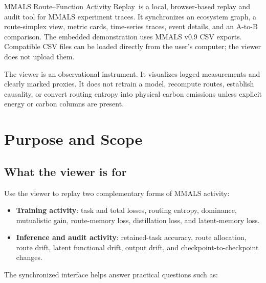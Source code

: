 \documentclass[11pt,a4paper]{article}
\newcommand{\product}{\textsf{MMALS Route--Function Activity Replay}}
\begin{document}
\thispagestyle{plain}
\begin{keybox}[At a glance]
\product\ is a local, browser-based replay and audit tool for MMALS experiment traces. It synchronizes an ecosystem graph, a route-simplex view, metric cards, time-series traces, event details, and an A-to-B comparison. The embedded demonstration uses MMALS v0.9 CSV exports. Compatible CSV files can be loaded directly from the user's computer; the viewer does not upload them.
\end{keybox}

\begin{warningbox}
The viewer is an observational instrument. It visualizes logged measurements and clearly marked proxies. It does not retrain a model, recompute routes, establish causality, or convert routing entropy into physical carbon emissions unless explicit energy or carbon columns are present.
\end{warningbox}

\tableofcontents
\clearpage

\section{Purpose and Scope}

\subsection{What the viewer is for}

Use the viewer to replay two complementary forms of MMALS activity:

\begin{itemize}
  \item \textbf{Training activity}: task and total losses, routing entropy, dominance, mutualistic gain, route-memory loss, distillation loss, and latent-memory loss.
  \item \textbf{Inference and audit activity}: retained-task accuracy, route allocation, route drift, latent functional drift, output drift, and checkpoint-to-checkpoint changes.
\end{itemize}

The synchronized interface helps answer practical questions such as:
\end{document}
